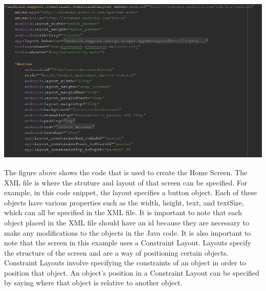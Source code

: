 \documentclass[onecolumn, draftclsnofoot,10pt, compsoc]{IEEEtran}
\begin{document}
 \begin{center}
\includegraphics[height=8cm]{main_content_xml.png}
\end{center}
The figure above shows the code that is used to create the Home Screen. The XML file is where the struture and layout of that screen can be specified. For example, in this code snippet, the layout specifies a button object. Each of these objects have various properties such as the width, height, text, and textSize, which can all be specified in the XML file. It is important to note that each object placed in the XML file should have an id because they are necessary to make any modifications to the objects in the Java code. It is also important to note that the screen in this example uses a Constraint Layout. Layouts specify the structure of the screen and are a way of positioning certain objects. Constraint Layouts involve specifying the constraints of an object in order to position that object. An object's position in a Constraint Layout can be specified by saying where that object is relative to another object.
\end{document}
